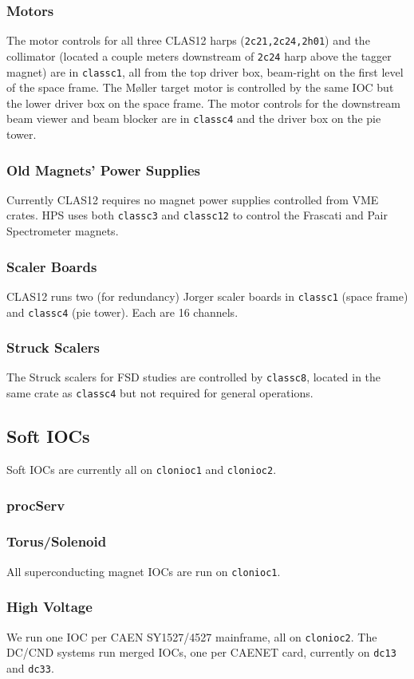 \documentclass[amsmath,amssymb,notitlepage,11pt]{revtex4}
\begin{document}
\subsubsection{Motors}
The motor controls for all three CLAS12 harps (\texttt{2c21,2c24,2h01}) and the collimator (located a couple meters downstream of \texttt{2c24} harp above the tagger magnet) are in \texttt{classc1}, all from the top driver box, beam-right on the first level of the space frame.  The M{\o}ller target motor is controlled by the same IOC but the lower driver box on the space frame.  The motor controls for the downstream beam viewer and beam blocker are in \texttt{classc4} and the driver box on the pie tower. 
\subsubsection{Old Magnets' Power Supplies}
Currently CLAS12 requires no magnet power supplies controlled from VME crates.  HPS uses both \texttt{classc3} and \texttt{classc12} to control the Frascati and Pair Spectrometer magnets.
\subsubsection{Scaler Boards}
CLAS12 runs two (for redundancy) Jorger scaler boards in \texttt{classc1} (space frame) and \texttt{classc4} (pie tower).  Each are 16 channels.
\subsubsection{Struck Scalers}
The Struck scalers for FSD studies are controlled by \texttt{classc8}, located in the same crate as \texttt{classc4} but not required for general operations.

\subsection{Soft IOCs}
Soft IOCs are currently all on \texttt{clonioc1} and \texttt{clonioc2}.
\subsubsection{procServ}
\subsubsection{Torus/Solenoid}
All superconducting magnet IOCs are run on \texttt{clonioc1}.
\subsubsection{High Voltage}
We run one IOC per CAEN SY1527/4527 mainframe, all on \texttt{clonioc2}.  The DC/CND systems run merged IOCs, one per CAENET card, currently on \texttt{dc13} and \texttt{dc33}.
\end{document}
